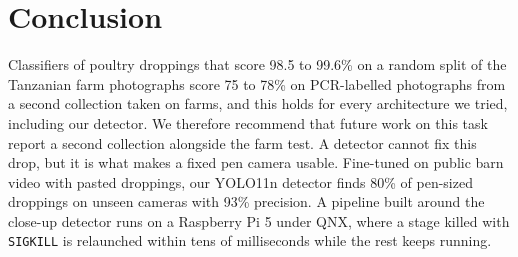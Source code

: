 \section{Conclusion}
\label{sec:conclusion}

Classifiers of poultry droppings that score 98.5 to 99.6\% on a random split of the Tanzanian farm photographs score
75 to 78\% on PCR-labelled photographs from a second collection taken on farms, and this holds for every architecture
we tried, including our detector. We therefore recommend that future work on this task report a second collection
alongside the farm test. A detector cannot fix this drop, but it is what makes a fixed pen camera usable. Fine-tuned
on public barn video with pasted droppings, our YOLO11n detector finds 80\% of pen-sized droppings on unseen cameras
with 93\% precision. A pipeline built around the close-up detector runs on a Raspberry Pi 5 under QNX, where a stage
killed with \texttt{SIGKILL} is relaunched within tens of milliseconds while the rest keeps running.
